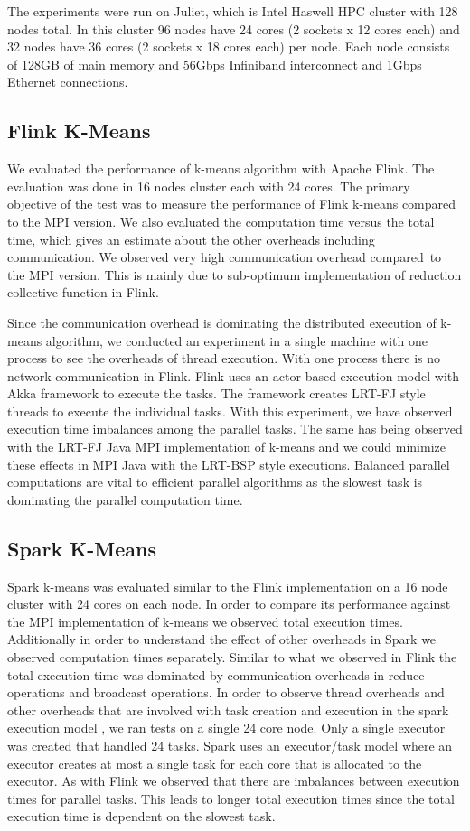 \documentclass[10pt, conference, compsocconf]{IEEEtran}
\begin{document}
The experiments were run on Juliet, which is Intel Haswell HPC cluster with 128 nodes total. In this cluster 96 nodes have 24 cores (2 sockets x 12 cores each) and 32 nodes have 36 cores (2 sockets x 18 cores each) per node. Each node consists of 128GB of main memory and 56Gbps Infiniband interconnect and 1Gbps Ethernet connections. 


\subsection{Flink K-Means}
We evaluated the performance of k-means algorithm with Apache Flink. The evaluation was done in 16 nodes cluster each with 24 cores. The primary objective of the test was to measure the performance of Flink k-means compared to the MPI version. We also evaluated the computation time versus the total time, which gives an estimate about the other overheads including communication. We observed very high communication overhead compared to the MPI version. This is mainly due to sub-optimum implementation of reduction collective function in Flink.

Since the communication overhead is dominating the distributed execution of k-means algorithm, we conducted an experiment in a single machine with one process to see the overheads of thread execution. With one process there is no network communication in Flink. Flink uses an actor based execution model with Akka framework to execute the tasks. The framework creates \ac{LRT-FJ} style threads to execute the individual tasks. With this experiment, we have observed execution time imbalances among the parallel tasks. The same has being observed with the \ac{LRT-FJ} Java MPI implementation of k-means and we could minimize these effects in MPI Java with the \ac{LRT-BSP} style executions. Balanced parallel computations are vital to efficient parallel algorithms as the slowest task is dominating the parallel computation time. 

\subsection{Spark K-Means}
Spark k-means was evaluated similar to the Flink implementation on a 16 node cluster with 24 cores on each node. In order to compare its performance against the MPI implementation of k-means we observed total execution times. Additionally in order to understand the effect of other overheads in Spark we observed computation times separately. Similar to what we observed in Flink the total execution time was dominated by communication overheads in reduce operations and broadcast operations. 
In order to observe thread overheads and other overheads that are involved with task creation and execution in the spark execution model , we ran tests on a single 24 core node. Only a single executor was created that handled 24 tasks. Spark uses an executor/task model where an executor creates at most a single task for each core that is allocated to the executor. As with Flink we observed that there are imbalances between execution times for parallel tasks. This leads to longer total execution times since the total execution time is dependent on the slowest task. 
\end{document}
